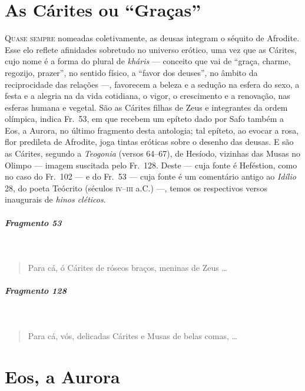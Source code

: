 \chapter{As Cárites ou “Graças”}

\textsc{Quase sempre} nomeadas coletivamente, as deusas integram o séquito de Afrodite.
Esse elo reflete afinidades sobretudo no universo erótico, uma vez que as
Cárites, cujo nome é a forma do plural de \textit{kháris }--- conceito que vai de
“graça, charme, regozijo, prazer”, no sentido físico, a “favor dos deuses”, no
âmbito da reciprocidade das relações ---, favorecem a beleza e a sedução na
esfera do sexo, a festa e a alegria na da vida cotidiana, o vigor, o
crescimento e a renovação, nas esferas humana e vegetal. São as Cárites
filhas de Zeus e integrantes da ordem olímpica, indica Fr.~53, em que
recebem um epíteto dado por Safo também a Eos, a Aurora, no último fragmento desta antologia;
tal epíteto, ao evocar a rosa, flor predileta de Afrodite, joga tintas eróticas
sobre o desenho das deusas. E são as Cárites, segundo a \textit{Teogonia}
(versos 64--67), de Hesíodo, vizinhas das Musas no Olimpo --- imagem suscitada
pelo Fr.~128. Deste --- cuja fonte é Heféstion, como no caso do Fr.~102 --- e do		\EP[]
Fr.~53 --- cuja fonte é um comentário antigo ao \textit{Idílio }28, do poeta
Teócrito (séculos \textsc{iv}--\textsc{iii} a.C.) ---, temos os respectivos versos inaugurais de
\textit{hinos cléticos}.
\pagebreak

\paragraph{Fragmento 53} \

\begin{verse}
Para cá, ó Cárites de róseos braços, meninas de \qb{}Zeus \ldots{}
\end{verse}

\paragraph{Fragmento 128} \ 

\begin{verse}
Para cá, vós, delicadas Cárites e Musas de belas \qb{}comas, \ldots{}
\end{verse}


\chapter{Eos, a Aurora}

